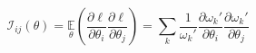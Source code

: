 \documentclass{article}
\begin{document}
\begin{equation}
\mathcal{I}_{ij}(\theta) = \underset{\theta}{\mathbb{E}}\left(\frac{\partial \ell}{\partial\theta_{i}}\frac{\partial\ell}{\partial\theta_{j}}\right) = \sum_{k}\frac{1}{\omega_{k}'}\frac{\partial \omega_{k}'}{\partial\theta_{i}}\frac{\partial \omega_{k}'}{\partial\theta_{j}}
\end{equation}
\end{document}
